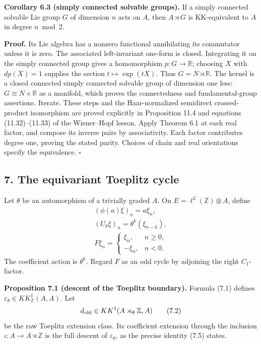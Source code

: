 \documentclass[
  11pt,
]{article}
\begin{document}
\textbf{Corollary 6.3 (simply connected solvable groups).} If a simply
connected solvable Lie group \(G\) of dimension \(n\) acts on \(A\),
then \(A\rtimes G\) is KK-equivalent to \(A\) in degree \(n\bmod2\).

\textbf{Proof.} Its Lie algebra has a nonzero functional annihilating
its commutator unless it is zero. The associated left-invariant one-form
is closed. Integrating it on the simply connected group gives a
homomorphism \(p:G\to\mathbb R\); choosing \(X\) with \(dp(X)=1\)
supplies the section \(t\mapsto\exp(tX)\). Thus \(G=N\rtimes\mathbb R\).
The kernel is a closed connected simply connected solvable group of
dimension one less: \(G\cong N\times\mathbb R\) as a manifold, which
proves the connectedness and fundamental-group assertions. Iterate.
These steps and the Haar-normalized semidirect crossed-product
isomorphism are proved explicitly in Proposition 11.4 and equations
(11.32)--(11.33) of the Wiener--Hopf lesson. Apply Theorem 6.1 at each
real factor, and compose its inverse pairs by associativity. Each factor
contributes degree one, proving the stated parity. Choices of chain and
real orientations specify the equivalence. \(\square\)

\subsection{7. The equivariant Toeplitz
cycle}\label{the-equivariant-toeplitz-cycle}

Let \(\theta\) be an automorphism of a trivially graded \(A\). On
\(E=\ell^2(\mathbb Z)\otimes A\), define \[
\begin{gathered}
(\phi(a)\xi)_n=a\xi_n,\\
(U_k\xi)_n=\theta^k(\xi_{n-k}),\\
F\xi_n=\begin{cases}\xi_n,&n\geq0,\\-\xi_n,&n<0.\end{cases}
\end{gathered}
\tag{7.1}
\] The coefficient action is \(\theta^k\). Regard \(F\) as an odd cycle
by adjoining the right \(C_1\)-factor.

\textbf{Proposition 7.1 (descent of the Toeplitz boundary).} Formula
(7.1) defines \(\varepsilon_\theta\in KK^1_{\mathbb Z}(A,A)\). Let \[
d_{\rm old}\in KK^1(A\rtimes_\theta\mathbb Z,A)
\tag{7.2}
\] be the raw Toeplitz extension class. Its coefficient extension
through the inclusion \(\iota:A\to A\rtimes\mathbb Z\) is the full
descent of \(\varepsilon_\theta\), as the precise identity (7.5) states.
\end{document}
